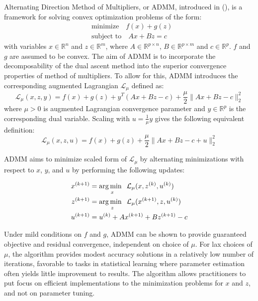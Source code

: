 Alternating Direction Method of Multipliers, or ADMM, introduced in (\cite{ADMM}), is a framework for solving convex optimization problems of the form:
\begin{equation}
    \label{admm:prob}
    \begin{aligned}
    &\text{minimize} \quad f(x) + g(z) \\
    &\text{subject to} \quad Ax + Bz = c
    \end{aligned}
\end{equation}
with variables $x \in \mathbb{R}^{n}$ and $z \in \mathbb{R}^{m}$, where $A \in \mathbb{R}^{p \times n}$, $B \in \mathbb{R}^{p \times m}$ and $c \in \mathbb{R}^{p}$. $f$ and $g$ are assumed to be convex. The aim of ADMM is to incorporate the decomposability of the dual ascent method into the superior convergence properties of method of multipliers. To allow for this, ADMM introduces the corresponding augmented Lagrangian $\mathcal{L}_{\mu}$ defined as:
\begin{equation}
    \label{admm:lagrangian}
    \mathcal{L}_{\mu}(x,z,y) = f(x) + g(z) + y^T(Ax + Bz - c) + \frac{\mu}{2} \|Ax + Bz - c\|_2^2
\end{equation}
where $\mu > 0$ is augmented Lagrangian convergence parameter and $y \in \mathbb{R}^{p}$ is the corresponding dual variable. Scaling with $u  = \frac{1}{\mu} y $ gives the following equivalent definition: 
\begin{equation}
    \label{admm:lagrangian-real}
    \mathcal{L}_{\mu}(x,z,u) = f(x) + g(z) + \frac{\mu}{2} \|Ax + Bz - c + u\|_2^2 
\end{equation}

ADMM aims to minimize scaled form of $\mathcal{L}_{\mu}$ by alternating minimizations with respect to $x$, $y$, and $u$ by performing the following updates:

\begin{equation}
    \label{admm:updates}
    \begin{aligned}
        x^{(k+1)} &= \operatorname*{arg\,min \;\;}_{x} \mathcal{L}_{\mu}(x,z^{(k)},u^{(k)})  \\
        z^{(k+1)} &= \operatorname*{arg\,min \;\;}_{z} \mathcal{L}_{\mu}(x^{(k+1)},z,u^{(k)}) \\
        u^{(k+1)} &= u^{(k)} + Ax^{(k+1)} + Bz^{(k+1)} - c 
    \end{aligned} 
\end{equation}

Under mild conditions on $f$ and $g$, ADMM can be shown to provide guaranteed objective and residual convergence, independent on choice of $\mu$. For lax choices of $\mu$, the algorithm provides modest accuracy solutions in a relatively low number of iterations, favorable to tasks in statistical learning where parameter estimation often yields little improvement to results. The algorithm allows practitioners to put focus on efficient implementations to the minimization problems for $x$ and $z$, and not on parameter tuning.

